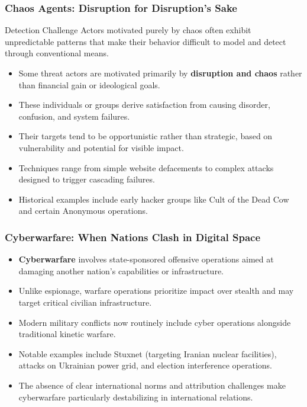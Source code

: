 \documentclass{beamer}
\begin{document}
\begin{frame}
    \frametitle{Chaos Agents: Disruption for Disruption's Sake}
    
    \begin{alertblock}{Detection Challenge}
        Actors motivated purely by chaos often exhibit unpredictable patterns that make their behavior difficult to model and detect through conventional means.
    \end{alertblock}
    
    \begin{itemize}
        \item Some threat actors are motivated primarily by \textbf{disruption and chaos} rather than financial gain or ideological goals.
        \item These individuals or groups derive satisfaction from causing disorder, confusion, and system failures.
        \item Their targets tend to be opportunistic rather than strategic, based on vulnerability and potential for visible impact.
        \item Techniques range from simple website defacements to complex attacks designed to trigger cascading failures.
        \item Historical examples include early hacker groups like Cult of the Dead Cow and certain Anonymous operations.
    \end{itemize}
\end{frame}

\begin{frame}
    \frametitle{Cyberwarfare: When Nations Clash in Digital Space}
    
    \begin{itemize}
        \item \textbf{Cyberwarfare} involves state-sponsored offensive operations aimed at damaging another nation's capabilities or infrastructure.
        \item Unlike espionage, warfare operations prioritize impact over stealth and may target critical civilian infrastructure.
        \item Modern military conflicts now routinely include cyber operations alongside traditional kinetic warfare.
        \item Notable examples include Stuxnet (targeting Iranian nuclear facilities), attacks on Ukrainian power grid, and election interference operations.
        \item The absence of clear international norms and attribution challenges make cyberwarfare particularly destabilizing in international relations.
    \end{itemize}
\end{frame}
\end{document}
